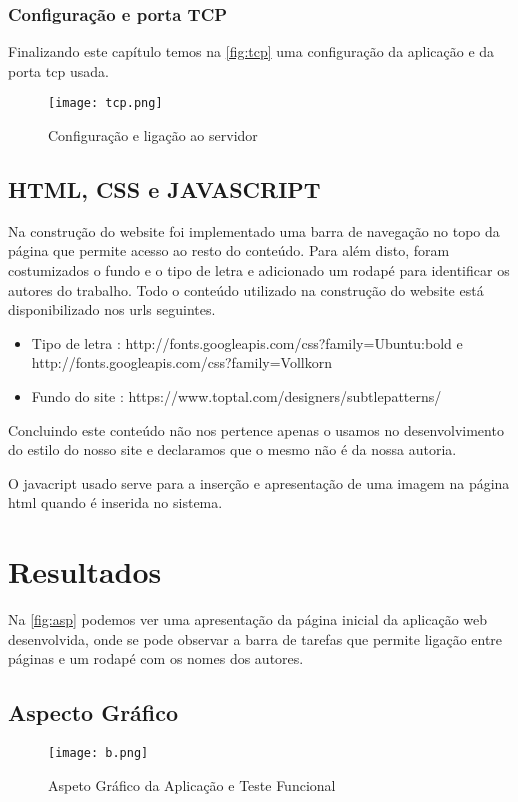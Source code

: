 \documentclass{report}
\begin{document}
\subsection{Configuração e porta TCP}

Finalizando este capítulo temos na \autoref{fig:tcp} uma configuração da aplicação e da porta tcp usada.

\begin{figure}[h]
\center %
\texttt{[image: tcp.png]}
\caption{Configuração e ligação ao servidor}
\label{fig:tcp}
\end{figure}



\section{HTML, CSS e JAVASCRIPT }

Na construção do website foi implementado uma barra de navegação no topo da página que permite acesso ao resto do conteúdo. Para além disto, foram costumizados o fundo e o tipo de letra e adicionado um rodapé para identificar os autores do trabalho. Todo o conteúdo utilizado na construção do website está disponibilizado nos urls seguintes.

\begin{itemize}
    \item Tipo de letra : http://fonts.googleapis.com/css?family=Ubuntu:bold e http://fonts.googleapis.com/css?family=Vollkorn
    \item Fundo do site : https://www.toptal.com/designers/subtlepatterns/
\end{itemize}

Concluindo este conteúdo não nos pertence apenas o usamos no desenvolvimento do estilo do nosso site e declaramos que o mesmo não é da nossa autoria.

O javacript usado serve para a inserção e apresentação de uma imagem na página html quando é inserida no sistema.
\chapter{Resultados}
\label{chap.result}

Na \autoref{fig:asp} podemos ver uma apresentação da página inicial da aplicação web desenvolvida, onde se pode observar a barra de tarefas que permite ligação entre páginas e um rodapé com os nomes dos autores.

\section{Aspecto Gráfico}
\begin{figure}[h]
\center %
\texttt{[image: b.png]}
\caption{Aspeto Gráfico da Aplicação e Teste Funcional}
\label{fig:asp}
\end{figure}
\end{document}
